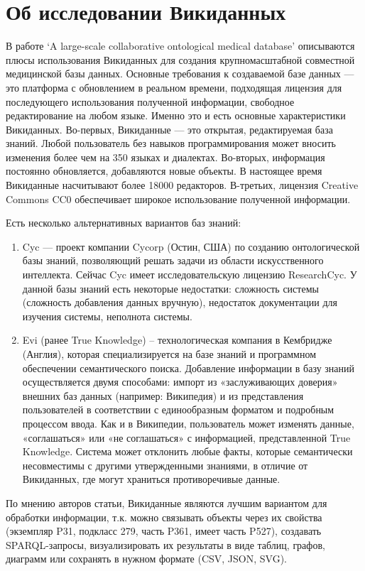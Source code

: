 \section{Об исследовании Викиданных}
В работе ‘A large-scale collaborative ontological medical database’\cite{Collaborative_ontological_database} описываются плюсы использования Викиданных для создания крупномасштабной совместной медицинской
базы данных. Основные требования к создаваемой базе данных — это платформа с обновлением в реальном времени, подходящая лицензия для последующего использования полученной информации, свободное редактирование на любом языке. Именно это и есть основные характеристики Викиданных. Во-первых, Викиданные — это открытая, редактируемая база знаний. Любой пользователь без навыков программирования может вносить изменения более чем на 350 языках и диалектах. Во-вторых, информация постоянно обновляется, добавляются новые объекты. В настоящее время Викиданные насчитывают более 18000 редакторов. В-третьих, лицензия Creative Commons CC0 обеспечивает широкое использование полученной информации.

Есть несколько альтернативных вариантов баз знаний:
\begin{enumerate}
\item Cyc — проект компании Cycorp (Остин, США) по созданию онтологической базы знаний, позволяющий решать задачи из области искусственного интеллекта\cite{Cyc}. Сейчас Cyc имеет исследовательскую лицензию ResearchCyc. У данной базы знаний есть некоторые недостатки: сложность системы (сложность добавления данных
вручную), недостаток документации для изучения системы, неполнота системы.
\item Evi (ранее True Knowledge\cite{True_Knowledge}) – технологическая компания в Кембридже (Англия), которая специализируется на базе знаний и программном обеспечении семантического поиска. Добавление информации в базу знаний осуществляется двумя способами: импорт из «заслуживающих доверия» внешних баз данных (например: Википедия) и из представления пользователей в соответствии с единообразным форматом и подробным процессом ввода. Как и в Википедии, пользователь может изменять
данные, «соглашаться» или «не соглашаться» с информацией, представленной True Knowledge. Система может отклонить любые факты, которые семантически несовместимы с другими утвержденными знаниями, в отличие от Викиданных, где могут
храниться противоречивые данные.
\end{enumerate}
По мнению авторов статьи, Викиданные являются лучшим вариантом для обработки информации, т.к. можно связывать объекты через их свойства (экземпляр P31, подкласс 279, часть P361, имеет часть P527), создавать SPARQL-запросы, визуализировать их результаты в виде таблиц, графов, диаграмм или сохранять в нужном формате (CSV, JSON, SVG).


